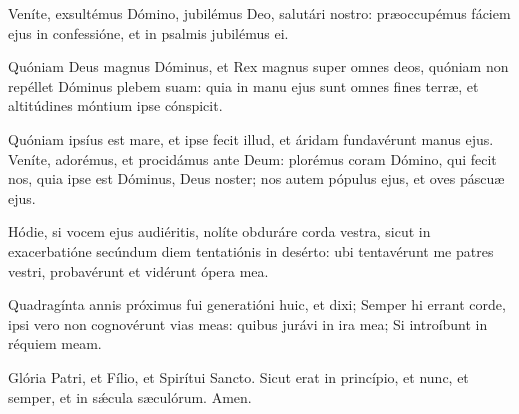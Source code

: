 \item Veníte, exsultémus Dómino, jubilémus Deo, salutári nostro: præoccupémus fáciem ejus in confessióne, et in psalmis jubilémus ei. 
\item Quóniam Deus magnus Dóminus, et Rex magnus super omnes deos, quóniam non repéllet Dóminus plebem suam: quia in manu ejus sunt omnes fines terræ, et altitúdines móntium ipse cónspicit. 
\item Quóniam ipsíus est mare, et ipse fecit illud, et áridam fundavérunt manus ejus.  Veníte, adorémus, et procidámus ante Deum: plorémus coram Dómino, qui fecit nos, quia ipse est Dóminus, Deus noster; nos autem pópulus ejus, et oves páscuæ ejus. 
\item Hódie, si vocem ejus audiéritis, nolíte obduráre corda vestra, sicut in exacerbatióne secúndum diem tentatiónis in desérto: ubi tentavérunt me patres vestri, probavérunt et vidérunt ópera mea. 
\item Quadragínta annis próximus fui generatióni huic, et dixi; Semper hi errant corde, ipsi vero non cognovérunt vias meas: quibus jurávi in ira mea; Si introíbunt in réquiem meam. 
\item Glória Patri, et Fílio, et Spirítui Sancto. Sicut erat in princípio, et nunc, et semper, et in sǽcula sæculórum. Amen. 